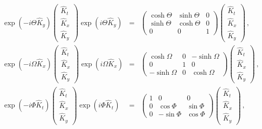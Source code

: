 \documentclass[12pt,amsmath,amssymb]{article}
\numberwithin{equation}{section}
\begin{document}
\begin{eqnarray}
\exp(-i\Theta\hat{K}_y) \left(
    \begin{array}{c}
     \hat{K}_t \\
     \hat{K}_x \\
     \hat{K}_y
    \end{array}
\right) \exp(i\Theta\hat{K}_y) &=& \left(
    \begin{array}{ccc}
      \cosh\Theta & \sinh\Theta & 0\\
      \sinh\Theta & \cosh\Theta & 0\\
      0 & 0 & 1
    \end{array}
\right) \left(
    \begin{array}{c}
     \hat{K}_t \\
     \hat{K}_x \\
     \hat{K}_y
    \end{array}
\right)\,, \nonumber\\
\exp(-i\Omega\hat{K}_x) \left(
    \begin{array}{c}
     \hat{K}_t \\
     \hat{K}_x \\
     \hat{K}_y
    \end{array}
\right) \exp(i\Omega\hat{K}_x) &=& \left(
    \begin{array}{ccc}
      \cosh\Omega & 0 & -\sinh\Omega\\
      0 & 1 & 0\\
      -\sinh\Omega & 0 & \cosh\Omega
    \end{array}
\right) \left(
    \begin{array}{c}
     \hat{K}_t \\
     \hat{K}_x \\
     \hat{K}_y
    \end{array}
\right)\,, \nonumber\\
\exp(-i\Phi\hat{K}_t) \left(
    \begin{array}{c}
     \hat{K}_t \\
     \hat{K}_x \\
     \hat{K}_y
    \end{array}
\right) \exp(i\Phi\hat{K}_t) &=& \left(
    \begin{array}{ccc}
      1 & 0 & 0\\
      0 & \cos\Phi & \sin\Phi\\
      0 & -\sin\Phi & \cos\Phi
    \end{array}
\right) \left(
    \begin{array}{c}
     \hat{K}_t \\
     \hat{K}_x \\
     \hat{K}_y
    \end{array}
\right)\,,
\end{eqnarray}
\end{document}
